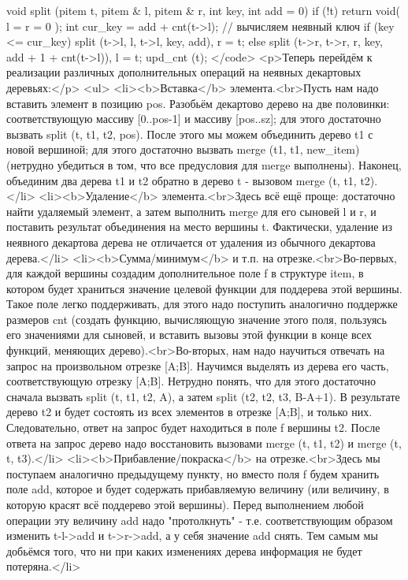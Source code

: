 void split (pitem t, pitem & l, pitem & r, int key, int add = 0) {
	if (!t)
		return void( l = r = 0 );
	int cur_key = add + cnt(t->l); // вычисляем неявный ключ
	if (key <= cur_key)
		split (t->l, l, t->l, key, add),  r = t;
	else
		split (t->r, t->r, r, key, add + 1 + cnt(t->l)),  l = t;
	upd_cnt (t);
}</code>
<p>Теперь перейдём к реализации различных дополнительных операций на неявных декартовых деревьях:</p>
<ul>
<li><b>Вставка</b> элемента.<br>Пусть нам надо вставить элемент в позицию pos. Разобьём декартово дерево на две половинки: соответствующую массиву [0..pos-1] и массиву [pos..sz]; для этого достаточно вызвать split (t, t1, t2, pos). После этого мы можем объединить дерево t1 с новой вершиной; для этого достаточно вызвать merge (t1, t1, new_item) (нетрудно убедиться в том, что все предусловия для merge выполнены). Наконец, объединим два дерева t1 и t2 обратно в дерево t - вызовом merge (t, t1, t2).</li>
<li><b>Удаление</b> элемента.<br>Здесь всё ещё проще: достаточно найти удаляемый элемент, а затем выполнить merge для его сыновей l и r, и поставить результат объединения на место вершины t. Фактически, удаление из неявного декартова дерева не отличается от удаления из обычного декартова дерева.</li>
<li><b>Сумма/минимум</b> и т.п. на отрезке.<br>Во-первых, для каждой вершины создадим дополнительное поле f в структуре item, в котором будет храниться значение целевой функции для поддерева этой вершины. Такое поле легко поддерживать, для этого надо поступить аналогично поддержке размеров cnt (создать функцию, вычисляющую значение этого поля, пользуясь его значениями для сыновей, и вставить вызовы этой функции в конце всех функций, меняющих дерево).<br>Во-вторых, нам надо научиться отвечать на запрос на произвольном отрезке [A;B]. Научимся выделять из дерева его часть, соответствующую отрезку [A;B]. Нетрудно понять, что для этого достаточно сначала вызвать split (t, t1, t2, A), а затем split (t2, t2, t3, B-A+1). В результате дерево t2 и будет состоять из всех элементов в отрезке [A;B], и только них. Следовательно, ответ на запрос будет находиться в поле f вершины t2. После ответа на запрос дерево надо восстановить вызовами merge (t, t1, t2) и merge (t, t, t3).</li>
<li><b>Прибавление/покраска</b> на отрезке.<br>Здесь мы поступаем аналогично предыдущему пункту, но вместо поля f будем хранить поле add, которое и будет содержать прибавляемую величину (или величину, в которую красят всё поддерево этой вершины). Перед выполнением любой операции эту величину add надо "протолкнуть" - т.е. соответствующим образом изменить t-l->add и t->r->add, а у себя значение add снять. Тем самым мы добьёмся того, что ни при каких изменениях дерева информация не будет потеряна.</li>
